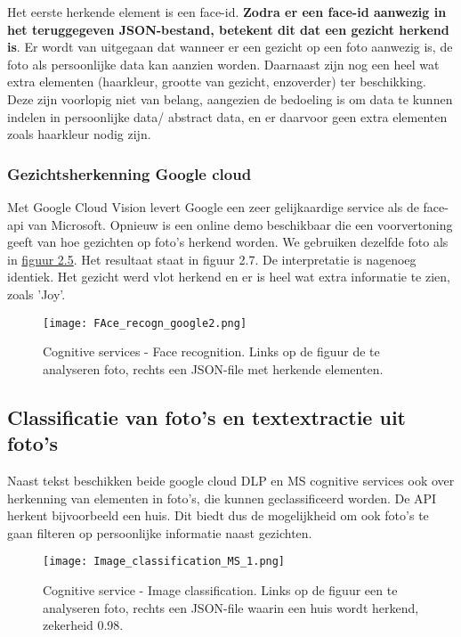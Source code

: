 Het eerste herkende element is een face-id. \textbf{Zodra er een face-id aanwezig in het teruggegeven JSON-bestand, betekent dit dat een gezicht herkend is}. Er wordt van uitgegaan dat wanneer er een gezicht op een foto aanwezig is, de foto als persoonlijke data kan aanzien worden. 
Daarnaast zijn nog een heel wat extra elementen (haarkleur, grootte van gezicht, enzoverder) ter beschikking. Deze zijn voorlopig niet van belang, aangezien de bedoeling is om data te kunnen indelen in persoonlijke data/ abstract data, en er daarvoor geen extra elementen zoals haarkleur nodig zijn. 


\subsubsection{Gezichtsherkenning Google cloud}
Met Google Cloud Vision levert Google een zeer gelijkaardige service als de face-api van Microsoft. Opnieuw is een online demo beschikbaar die een voorvertoning geeft van hoe gezichten op foto's herkend worden. We gebruiken dezelfde foto als in \hyperref[fig:cognitive2]{figuur 2.5}. Het resultaat staat in figuur 2.7. De interpretatie is nagenoeg identiek. Het gezicht werd vlot herkend en er is heel wat extra informatie te zien, zoals 'Joy'. 

\begin{figure}[h]
	\texttt{[image: FAce\_recogn\_google2.png]}
	\caption{Cognitive services - Face recognition. Links op de figuur de te analyseren foto, rechts een JSON-file met herkende elementen.}
	\label{fig:facerecogn}
\end{figure}


\subsection{Classificatie van foto's en textextractie uit foto's}
Naast tekst beschikken beide google cloud DLP en MS cognitive services ook over herkenning van elementen in foto's, die kunnen geclassificeerd worden. De API herkent bijvoorbeeld een huis. Dit biedt dus de mogelijkheid om ook foto's te gaan filteren op persoonlijke informatie naast gezichten. 


\begin{figure}[h]
	\texttt{[image: Image\_classification\_MS\_1.png]}
	\caption{Cognitive service - Image classification. Links op de figuur een te analyseren foto, rechts een JSON-file waarin een huis wordt herkend, zekerheid 0.98. }
	\label{fig:Houserecogn}
\end{figure}

